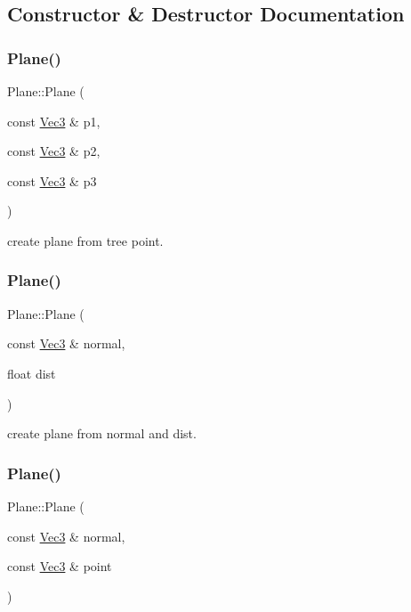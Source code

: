 \subsection{Constructor \& Destructor Documentation}
\mbox{\label{classPlane_a85cfdb4f3357ad2ec06e2e1b469d7999}} 
\subsubsection{\texorpdfstring{Plane()}{Plane()}\hspace{0.1cm}{\footnotesize\ttfamily [1/8]}}
{\footnotesize\ttfamily Plane\+::\+Plane (\begin{DoxyParamCaption}\item[{const \hyperlink{classVec3}{Vec3} \&}]{p1,  }\item[{const \hyperlink{classVec3}{Vec3} \&}]{p2,  }\item[{const \hyperlink{classVec3}{Vec3} \&}]{p3 }\end{DoxyParamCaption})}

create plane from tree point. \mbox{\label{classPlane_a609be2a0b19f0d96d1a282357dd0005c}} 
\subsubsection{\texorpdfstring{Plane()}{Plane()}\hspace{0.1cm}{\footnotesize\ttfamily [2/8]}}
{\footnotesize\ttfamily Plane\+::\+Plane (\begin{DoxyParamCaption}\item[{const \hyperlink{classVec3}{Vec3} \&}]{normal,  }\item[{float}]{dist }\end{DoxyParamCaption})}

create plane from normal and dist. \mbox{\label{classPlane_ae7c0502b316e1b7b6cd3952681cf125d}} 
\subsubsection{\texorpdfstring{Plane()}{Plane()}\hspace{0.1cm}{\footnotesize\ttfamily [3/8]}}
{\footnotesize\ttfamily Plane\+::\+Plane (\begin{DoxyParamCaption}\item[{const \hyperlink{classVec3}{Vec3} \&}]{normal,  }\item[{const \hyperlink{classVec3}{Vec3} \&}]{point }\end{DoxyParamCaption})}

